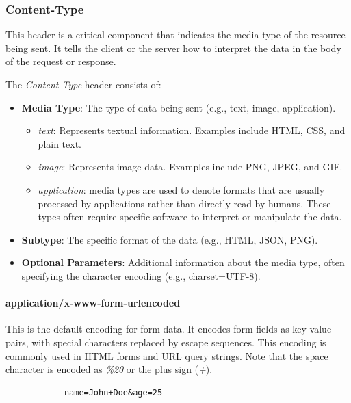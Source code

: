 \documentclass[a4paper]{article}
\begin{document}
        \subsubsection{Content-Type} This header is a critical component that indicates the media type of the resource being sent. It tells the client or the server how to interpret the data in the body of the request or response. 

        The \textit{Content-Type} header consists of: 

        \begin{itemize}
            \item \textbf{Media Type}: The type of data being sent (e.g., text, image, application).
            \begin{itemize}
                \item \textit{text}: Represents textual information. Examples include HTML, CSS, and plain text.
                \item \textit{image}: Represents image data. Examples include PNG, JPEG, and GIF.
                \item \textit{application}: media types are used to denote formats that are usually processed by applications rather than directly read by humans. These types often require specific software to interpret or manipulate the data.
            \end{itemize}
            \item \textbf{Subtype}: The specific format of the data (e.g., HTML, JSON, PNG).
            \item \textbf{Optional Parameters}: Additional information about the media type, often specifying the character encoding (e.g., charset=UTF-8).
        \end{itemize}

        \paragraph{application/x-www-form-urlencoded} This is the default encoding for form data. It encodes form fields as key-value pairs, with special characters replaced by escape sequences. This encoding is commonly used in HTML forms and URL query strings. Note that the space character is encoded as \textit{\%20} or the plus sign (\textit{+}).

        \begin{verbatim}
            name=John+Doe&age=25
        \end{verbatim}
\end{document}
